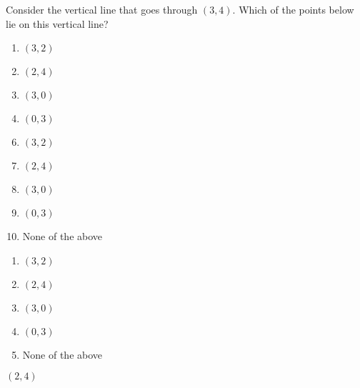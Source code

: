 



 Consider the vertical line that goes through $(3,4)$.  Which of the points below lie on this vertical line?


\ifsat
	\begin{enumerate}[label=\Alph*)]
		\item   $(3,2)$
		\item  $(2,4)$%
		\item  $(3,0)$
		\item  $(0,3)$ 
	\end{enumerate}
\else
\fi

\ifacteven
	\begin{enumerate}[label=\textbf{\Alph*.},itemsep=\fill,align=left]
		\setcounter{enumii}{5}
		\item   $(3,2)$
		\item  $(2,4)$%
		\item  $(3,0)$
		\addtocounter{enumii}{1}
		\item  $(0,3)$ 
		\item  None of the above 
	\end{enumerate}
\else
\fi

\ifactodd
	\begin{enumerate}[label=\textbf{\Alph*.},itemsep=\fill,align=left]
		\item   $(3,2)$
		\item  $(2,4)$%
		\item  $(3,0)$
		\item  $(0,3)$ 
		\item  None of the above 
	\end{enumerate}
\else
\fi

\ifgridin
  $(2,4)$%
		
\else
\fi

